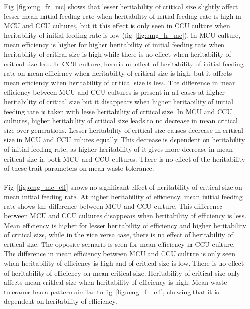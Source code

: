 \noindent Fig~\ref{fig:omg_fr_mc} shows that lesser heritability of critical size slightly affect lesser mean initial feeding rate when heritability of initial feeding rate is high in MCU and CCU cultures, but it this effect is only seen in CCU culture when heritability of initial feeding rate is low (fig~\ref{fig:omg_fr_mc}). In MCU culture, mean efficiency is higher for higher heritability of initial feeding rate when heritability of critical size is high while there is no effect when heritability of critical size less. In CCU culture, here is no effect of heritability of initial feeding rate on mean efficiency when heritability of critical size is high, but it affects mean efficiency when heritability of critical size is less. The difference in mean efficiency between MCU and CCU cultures is present in all cases at higher heritability of critical size but it disappears when higher heritability of initial feeding rate is taken with lesse heritability of critical size. In MCU and CCU cultures, higher heritability of critical size leads to no decrease in mean critical size over generations. Lesser heritability of critical size causes decrease in critical size in MCU and CCU culures equally. This decrease is dependent on heritability of initial feeding rate, as higher heritability of it gives more decrease in mean critical size in both MCU and CCU cultures. There is no effect of the heritability of these trait parameters on mean waste tolerance.\\\\
Fig~\ref{fig:omg_mc_eff} shows no significant effect of heritability of critical size on mean initial feeding rate. At higher heritability of efficiency, mean initial feeding rate shows the difference between MCU and CCU culture. This difference between MCU and CCU cultures disappears when heritability of efficiency is less. Mean efficiency is higher for lesser heritability of efficiency and higher heritability of critical size, while in the vice versa case, there is no effect of heritability of critical size. The opposite scenario is seen for mean efficiency in CCU culture. The difference in mean efficiency between MCU and CCU culture is only seen when heritability of efficiency is high and of critical size is low. There is no effect of heritability of efficiency on mean critical size. Heritability of critical size only affects mean critIcal size when heritability of efficiency is high. Mean waste tolerance has a pattern similar to fig~\ref{fig:omg_fr_eff}, showing that it is dependent on heritability of efficiency.
